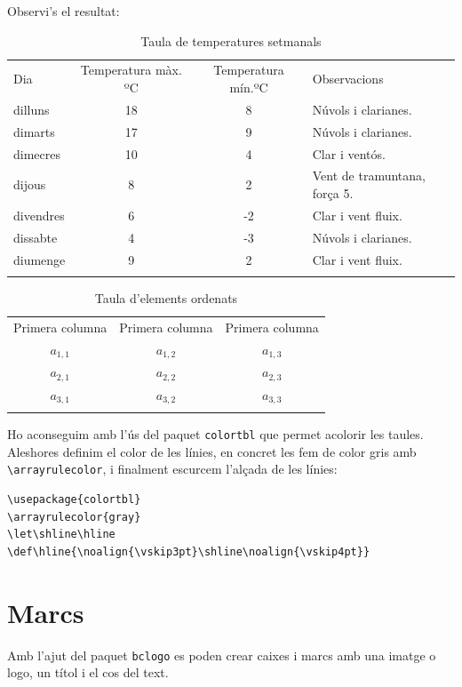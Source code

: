 \documentclass[a4paper,
                             twoside,
                             BCOR1.0cm,
                             DIV11,
                             parskip=full,
                             11pt]{scrbook}
\let\shline\hline
\def\hline{\noalign{\vskip3pt}\shline\noalign{\vskip4pt}}
\begin{document}
Observi's el resultat:

\begin{table}[h]
\centering
\begin{tabular}{l|c|c|l}
\hline
Dia & Temperatura màx. ºC & Temperatura mín.ºC & Observacions \\
\hline
dilluns   & 18 & 8 & Núvols i clarianes. \\
dimarts   & 17 & 9 & Núvols i clarianes. \\
dimecres  & 10 & 4 & Clar i ventós. \\
dijous    &  8 & 2 & Vent de tramuntana, força 5. \\
divendres &  6 & -2 & Clar i vent fluix. \\
dissabte  & 4 & -3 & Núvols i clarianes. \\
diumenge  & 9 & 2 &  Clar i vent fluix. \\
\hline
\end{tabular}
\caption{Taula de temperatures setmanals}\label{tab:temp}
\end{table}

\begin{table}[h]
\centering
\begin{tabular}{c|c|c}
\hline
Primera columna & Primera columna & Primera columna \\
\hline
$a_{1,1}$ & $a_{1,2}$ & $a_{1,3}$ \\
$a_{2,1}$ & $a_{2,2}$ & $a_{2,3}$ \\
$a_{3,1}$ & $a_{3,2}$ & $a_{3,3}$ \\
\hline
\end{tabular}
\caption{Taula d'elements ordenats}\label{tab:ordre}
\end{table}

Ho aconseguim amb l'ús del paquet \verb+colortbl+ que permet acolorir les taules. Aleshores definim el color de les línies, en concret les fem de color gris amb \verb+\arrayrulecolor+, i finalment escurcem l'alçada de les línies:

\begin{verbatim}
\usepackage{colortbl}
\arrayrulecolor{gray}
\let\shline\hline
\def\hline{\noalign{\vskip3pt}\shline\noalign{\vskip4pt}}
\end{verbatim}

\section{Marcs}\label{sec:marcs}
Amb l'ajut del paquet \verb+bclogo+ es poden crear caixes i marcs amb una imatge o logo, un títol i el cos del text.
\end{document}
